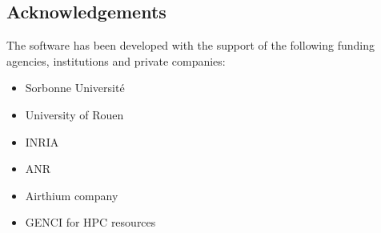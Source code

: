 \subsection{Acknowledgements}
\label{sec::Freefem++:acknowledgements}

The software has been developed with the support of the following funding agencies, institutions and private companies: 

\begin{itemize}
\item Sorbonne Université
\item University of Rouen
\item INRIA
\item ANR
\item Airthium company
\item GENCI for HPC resources
\end{itemize}
